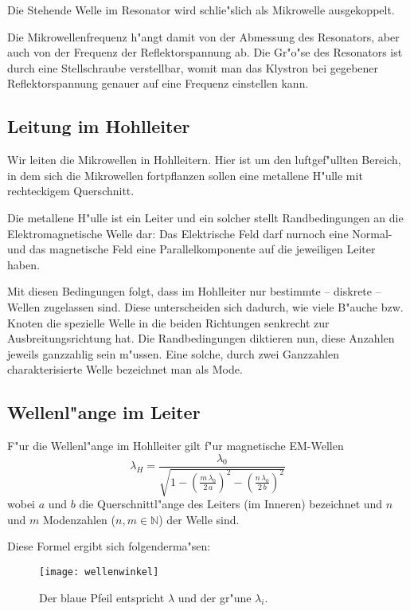 \documentclass[a4paper,12pt]{article}
\begin{document}
Die Stehende Welle im Resonator wird schlie"slich als Mikrowelle
ausgekoppelt.

Die Mikrowellenfrequenz h"angt damit von der Abmessung des Resonators,
aber auch von der Frequenz der Reflektorspannung ab. Die Gr"o"se des
Resonators ist durch eine Stellschraube verstellbar, womit man das
Klystron bei gegebener Reflektorspannung genauer auf eine Frequenz
einstellen kann.


\subsection{Leitung im Hohlleiter}
\label{sec:leitung_im_hohlleiter}

Wir leiten die Mikrowellen in Hohlleitern. Hier ist um den
luftgef"ullten Bereich, in dem sich die Mikrowellen fortpflanzen
sollen eine metallene H"ulle mit rechteckigem Querschnitt.

Die metallene H"ulle ist ein Leiter und ein solcher stellt
Randbedingungen an die Elektromagnetische Welle dar: Das Elektrische
Feld darf nurnoch eine Normal- und das magnetische Feld eine
Parallelkomponente auf die jeweiligen Leiter haben.

Mit diesen Bedingungen folgt, dass im Hohlleiter nur bestimmte --
diskrete -- Wellen zugelassen sind. Diese unterscheiden sich dadurch,
wie viele B"auche bzw. Knoten die spezielle Welle in die beiden
Richtungen senkrecht zur Ausbreitungsrichtung hat.  Die
Randbedingungen diktieren nun, diese Anzahlen jeweils ganzzahlig sein
m"ussen.  Eine solche, durch zwei Ganzzahlen charakterisierte Welle
bezeichnet man als Mode.


\subsection{Wellenl"ange im Leiter}
\label{sec:wellenlange_im_leiter-theor}


F"ur die Wellenl"ange im Hohlleiter gilt f"ur magnetische EM-Wellen
\begin{equation}
  \label{eq:5}
  \lambda_H = \frac{ \lambda_0 }{ \sqrt{ 1- \left( \frac{ m\,
          \lambda_0}{2\,a} \right)^2 - \left( \frac{n\,
          \lambda_0}{2\,b} \right)^2 }  }
\end{equation}
wobei $a$ und $b$ die Querschnittl"ange des Leiters (im Inneren)
bezeichnet und $n$ und $m$ Modenzahlen ($n,m \in \mathbb N$) der Welle
sind. 


Diese Formel ergibt sich folgenderma"sen:

\begin{wrapfigure}{l}{0.52\textwidth}
  \texttt{[image: wellenwinkel]}
\caption{Der blaue Pfeil entspricht $\lambda$ und der gr"une $\lambda_i$.}
\end{wrapfigure}
\end{document}
